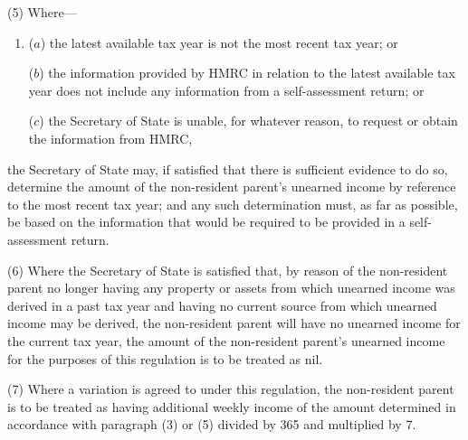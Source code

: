 \documentclass[12pt,a4paper]{article}
\begin{document}
(5) Where—
\begin{enumerate}\item[]
($a$) the latest available tax year is not the most recent tax year; or

($b$) the information provided by HMRC in relation to the latest available tax year does not include any information from a self-assessment return;
%
or

($c$) the Secretary of State is unable, for whatever reason, to request or obtain the information from HMRC,
\end{enumerate}
the Secretary of State may, if satisfied that there is sufficient evidence to do so, determine the amount of the non-resident parent’s unearned income by reference to the most recent tax year; and any such determination must, as far as possible, be based on the information that would be required to be provided in a self-assessment return.

(6) Where the Secretary of State is satisfied that, by reason of the non-resident parent no longer having any property or assets from which unearned income was derived in a past tax year and having no current source from which unearned income may be derived, the non-resident parent will have no unearned income for the current tax year, the amount of the non-resident parent’s unearned income for the purposes of this regulation is to be treated as nil.

(7) Where a variation is agreed to under this regulation, the non-resident parent is to be treated as having additional weekly income of the amount determined in accordance with paragraph (3) or (5) divided by 365 and multiplied by 7.

%
\end{document}
